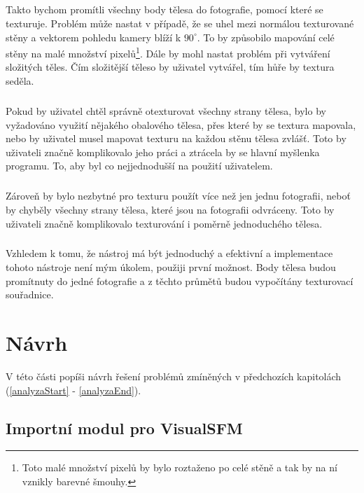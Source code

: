 \documentclass[11pt,twoside,a4paper]{book}
\begin{document}
\paragraph{}
Takto bychom promítli všechny body tělesa do fotografie, pomocí které se texturuje. Problém může nastat v případě, že se uhel mezi normálou texturované stěny a vektorem pohledu kamery blíží k $90^{\circ}$. To by způsobilo mapování celé stěny na malé množství pixelů\footnote{Toto malé množství pixelů by bylo roztaženo po celé stěně a tak by na ní vznikly barevné šmouhy.}. Dále by mohl nastat problém při vytváření složitých těles. Čím složitější těleso by uživatel vytvářel, tím hůře by textura seděla.
\paragraph{}
Pokud by uživatel chtěl správně otexturovat všechny strany tělesa, bylo by vyžadováno využití nějakého obalového tělesa, přes které by se textura mapovala, nebo by uživatel musel mapovat texturu na každou stěnu tělesa zvlášť. Toto by uživateli značně komplikovalo jeho práci a ztrácela by se hlavní myšlenka programu. To, aby byl co nejjednodušší na použití uživatelem.
\paragraph{}
Zároveň by bylo nezbytné pro texturu použít více než jen jednu fotografii, neboť by chyběly všechny strany tělesa, které jsou na fotografii odvráceny. Toto by uživateli značně komplikovalo texturování i poměrně jednoduchého tělesa. 
\paragraph{}
Vzhledem k tomu, že nástroj má být jednoduchý a efektivní a implementace tohoto nástroje není mým úkolem, použiji první možnost. Body tělesa budou promítnuty do jedné fotografie a z těchto průmětů budou vypočítány texturovací souřadnice.

%
%
%
\chapter{Návrh}
V této části popíši návrh řešení problémů zmíněných v předchozích kapitolách (\ref{analyzaStart} - \ref{analyzaEnd}). 

\section{Importní modul pro VisualSFM}
\label{navrhStart}
\end{document}
